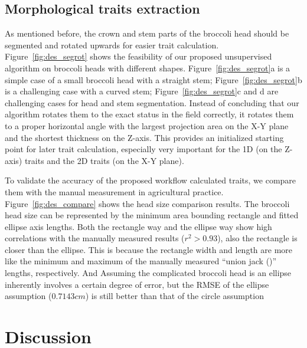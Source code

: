 

\subsection{Morphological traits extraction}

As mentioned before, the crown and stem parts of the broccoli head should be segmented and rotated upwards for easier trait calculation. Figure~\ref{fig:des_segrot} shows the feasibility of our proposed unsupervised algorithm on broccoli heads with different shapes. Figure~\ref{fig:des_segrot}a is a simple case of a small broccoli head with a straight stem; Figure~\ref{fig:des_segrot}b is a challenging case with a curved stem;  Figure~\ref{fig:des_segrot}c and d are challenging cases for head and stem segmentation. Instead of concluding that our algorithm rotates them to the exact status in the field correctly, it rotates them to a proper horizontal angle with the largest projection area on the X-Y plane and the shortest thickness on the Z-axis. This provides an initialized starting point for later trait calculation, especially very important for the 1D (on the Z-axis) traits and the 2D traits (on the X-Y plane).



To validate the accuracy of the proposed workflow calculated traits, we compare them with the manual measurement in agricultural practice. Figure~\ref{fig:des_compare} shows the head size comparison results. The broccoli head size can be represented by the minimum area bounding rectangle and fitted ellipse axis lengths. Both the rectangle way and the ellipse way show high correlations with the manually measured results ($r^2>0.93$), also the rectangle is closer than the ellipse. This is because the rectangle width and length are more like the minimum and maximum of the manually measured ``union jack ()'' lengths, respectively. And Assuming the complicated broccoli head is an ellipse inherently involves a certain degree of error, but the RMSE of the ellipse assumption ($0.7143 cm$) is still better than that of the circle assumption \citep[Table 5, RMSE$=0.97 cm$]{blok_image_2021}



\section{Discussion}


